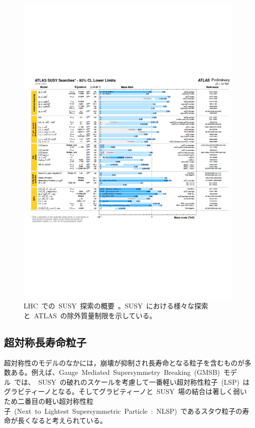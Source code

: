 \begin{figure}[H]
        \centering   
        \includegraphics[width=\textwidth,page=1]{img/pdf/susy1.pdf}
        \caption[LHC~での~SUSY~探索の概要]{LHC~での~SUSY~探索の概要~\cite{AR:13}。SUSY~における様々な探索と~ATLAS~の除外質量制限を示している。}\label{fig:susy1}
\end{figure}


\subsection{超対称長寿命粒子}
\label{subsec:LSP}
超対称性のモデルのなかには，崩壊が抑制され長寿命となる粒子を含むものが多数ある。例えば、Gauge~Mediated~Supersymmetry~Breaking~(GMSB)~モデル~\cite{AR:12}では、~SUSY~の破れのスケールを考慮して一番軽い超対称性粒子~(LSP)~はグラビティーノとなる。そしてグラビティーノと~SUSY~場の結合は著しく弱いため二番目の軽い超対称性粒子~(Next~to~Lightest~Supersymmetric~Particle~:~NLSP)~であるスタウ粒子の寿命が長くなると考えられている。

